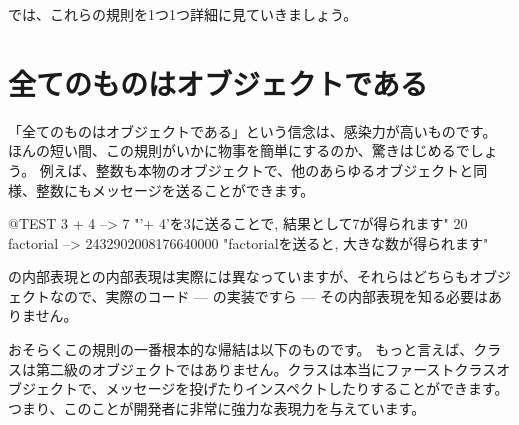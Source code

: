 \documentclass[a4paper,10pt,twoside]{book}
\begin{document}
\noindent
では、これらの規則を1つ1つ詳細に見ていきましょう。


\section{全てのものはオブジェクトである}


「全てのものはオブジェクトである」という信念は、感染力が高いものです。
ほんの短い間、この規則がいかに物事を簡単にするのか、驚きはじめるでしょう。
例えば、整数も本物のオブジェクトで、他のあらゆるオブジェクトと同様、整数にもメッセージを送ることができます。

\begin{code}{@TEST}
3 + 4            --> 7    "'+ 4'を3に送ることで, 結果として7が得られます"
20 factorial  --> 2432902008176640000   "factorialを送ると, 大きな数が得られます"
\end{code}

の内部表現との内部表現は実際には異なっていますが、それらはどちらもオブジェクトなので、実際のコード --- の実装ですら --- その内部表現を知る必要はありません。

おそらくこの規則の一番根本的な帰結は以下のものです。
もっと言えば、クラスは第二級のオブジェクトではありません。クラスは本当にファーストクラスオブジェクトで、メッセージを投げたりインスペクトしたりすることができます。
つまり、このことが開発者に非常に強力な表現力を与えています。
\end{document}
